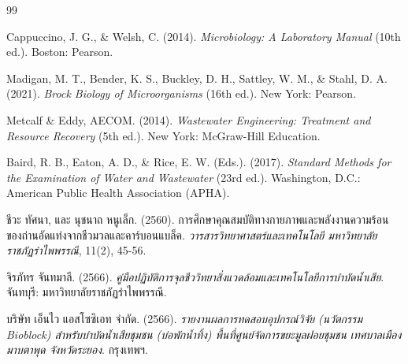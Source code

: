 \begin{thebibliography}{99}

Cappuccino, J. G., \& Welsh, C. (2014). \textit{Microbiology: A Laboratory Manual} (10th ed.). Boston: Pearson.

Madigan, M. T., Bender, K. S., Buckley, D. H., Sattley, W. M., \& Stahl, D. A. (2021). \textit{Brock Biology of Microorganisms} (16th ed.). New York: Pearson.

Metcalf \& Eddy, AECOM. (2014). \textit{Wastewater Engineering: Treatment and Resource Recovery} (5th ed.). New York: McGraw-Hill Education.

Baird, R. B., Eaton, A. D., \& Rice, E. W. (Eds.). (2017). \textit{Standard Methods for the Examination of Water and Wastewater} (23rd ed.). Washington, D.C.: American Public Health Association (APHA).

ชีวะ ทัศนา, และ นุชนาถ หนูเล็ก. (2560). การศึกษาคุณสมบัติทางกายภาพและพลังงานความร้อนของถ่านอัดแท่งจากชีวมวลและคาร์บอนแบล็ค. \textit{วารสารวิทยาศาสตร์และเทคโนโลยี มหาวิทยาลัยราชภัฏรำไพพรรณี}, 11(2), 45-56.

จิรภัทร จันทมาลี. (2566). \textit{คู่มือปฏิบัติการจุลชีววิทยาสิ่งแวดล้อมและเทคโนโลยีการบำบัดน้ำเสีย}. จันทบุรี: มหาวิทยาลัยราชภัฏรำไพพรรณี.

บริษัท เอ็นไว แอสโซซิเอท จำกัด. (2566). \textit{รายงานผลการทดสอบอุปกรณ์วิจัย (นวัตกรรม Bioblock) สำหรับบำบัดน้ำเสียชุมชน (บ่อพักน้ำทิ้ง) พื้นที่ศูนย์จัดการขยะมูลฝอยชุมชน เทศบาลเมืองมาบตาพุด จังหวัดระยอง}. กรุงเทพฯ.

\end{thebibliography}
